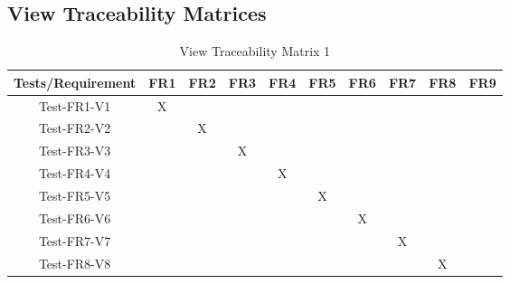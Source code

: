 \documentclass[12pt, titlepage]{article}
\begin{document}
\newpage
\subsection{View Traceability Matrices}
\begin{table}[htp]
\centering
\caption{View Traceability Matrix 1}
\begin{tabular}{|c|c|c|c|c|c|c|c|c|c|}
\hline
Tests/Requirement & FR1 & FR2 & FR3 & FR4 & FR5 & FR6 & FR7 & FR8 & FR9 \\
\hline
Test-FR1-V1       & X   &     &     &     &     &     &     &     &     \\
\hline
Test-FR2-V2       &     & X   &     &     &     &     &     &     &     \\
\hline
Test-FR3-V3       &     &     & X   &     &     &     &     &     &     \\
\hline
Test-FR4-V4       &     &     &     & X   &     &     &     &     &     \\
\hline
Test-FR5-V5       &     &     &     &     & X   &     &     &     &     \\
\hline
Test-FR6-V6       &     &     &     &     &     & X   &     &     &     \\
\hline
Test-FR7-V7       &     &     &     &     &     &     & X   &     &     \\
\hline
Test-FR8-V8       &     &     &     &     &     &     &     & X   &     \\
\hline
\end{tabular}
\end{table}
\end{document}

